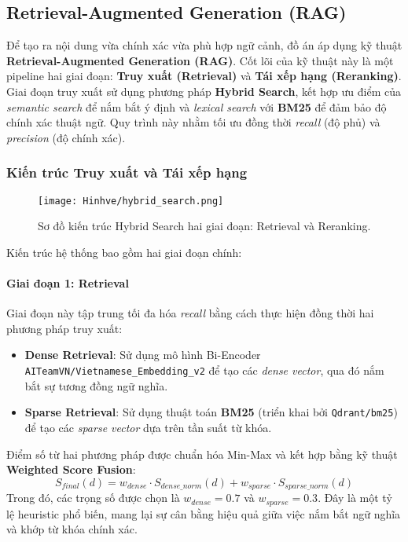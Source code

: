 \subsection{Retrieval-Augmented Generation (RAG)}

Để tạo ra nội dung vừa chính xác vừa phù hợp ngữ cảnh, đồ án áp dụng kỹ thuật \textbf{Retrieval-Augmented Generation (RAG)}. Cốt lõi của kỹ thuật này là một pipeline hai giai đoạn: \textbf{Truy xuất (Retrieval)} và \textbf{Tái xếp hạng (Reranking)}. Giai đoạn truy xuất sử dụng phương pháp \textbf{Hybrid Search}, kết hợp ưu điểm của \textit{semantic search} để nắm bắt ý định và \textit{lexical search} với \textbf{BM25} để đảm bảo độ chính xác thuật ngữ. Quy trình này nhằm tối ưu đồng thời \textit{recall} (độ phủ) và \textit{precision} (độ chính xác).

\subsubsection{Kiến trúc Truy xuất và Tái xếp hạng}

\begin{figure}[H]
    \centering
    \texttt{[image: Hinhve/hybrid\_search.png]}
    \caption{Sơ đồ kiến trúc Hybrid Search hai giai đoạn: Retrieval và Reranking.}
    \label{fig:hybrid_search}
\end{figure}

Kiến trúc hệ thống bao gồm hai giai đoạn chính:

\paragraph{Giai đoạn 1: Retrieval}
Giai đoạn này tập trung tối đa hóa \textit{recall} bằng cách thực hiện đồng thời hai phương pháp truy xuất:
\begin{itemize}
    \item \textbf{Dense Retrieval}: Sử dụng mô hình Bi-Encoder \texttt{AITeamVN/Vietnamese\_Embedding\_v2} để tạo các \textit{dense vector}, qua đó nắm bắt sự tương đồng ngữ nghĩa.
    \item \textbf{Sparse Retrieval}: Sử dụng thuật toán \textbf{BM25} (triển khai bởi \texttt{Qdrant/bm25}) để tạo các \textit{sparse vector} dựa trên tần suất từ khóa.
\end{itemize}
Điểm số từ hai phương pháp được chuẩn hóa Min-Max và kết hợp bằng kỹ thuật \textbf{Weighted Score Fusion}:
\[ S_{final}(d) = w_{dense} \cdot S_{dense\_norm}(d) + w_{sparse} \cdot S_{sparse\_norm}(d) \]
Trong đó, các trọng số được chọn là \(w_{dense}=0.7\) và \(w_{sparse}=0.3\). Đây là một tỷ lệ heuristic phổ biến, mang lại sự cân bằng hiệu quả giữa việc nắm bắt ngữ nghĩa và khớp từ khóa chính xác.

